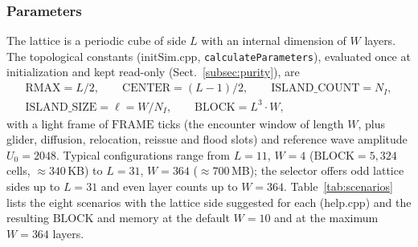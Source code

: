 \documentclass{ijuc}
\begin{document}
\subsubsection{Parameters}\label{subsubsec:parameters}
The lattice is a periodic cube of side $L$ with an internal dimension of $W$ layers.  The topological constants (initSim.cpp, \texttt{calculateParameters}), evaluated once at initialization and kept read-only (Sect.~\ref{subsec:purity}), are
\begin{multline*}
\mathrm{RMAX}=L/2,\qquad \mathrm{CENTER}=(L-1)/2,\qquad
\mathrm{ISLAND\_COUNT}=N_{I},\\
\mathrm{ISLAND\_SIZE}=\ell=W/N_{I},\qquad \mathrm{BLOCK}=L^{3}\cdot W,
\end{multline*}
with a light frame of $\mathrm{FRAME}$ ticks (the encounter window of length $W$, plus glider, diffusion, relocation, reissue and flood slots) and reference wave amplitude $U_{0}=2048$.  Typical configurations range from $L=11$, $W=4$ ($\mathrm{BLOCK}=5{,}324$ cells, $\approx 340$\,KB) to $L=31$, $W=364$ ($\approx 700$\,MB); the selector offers odd lattice sides up to $L=31$ and even layer counts up to $W=364$.  Table~\ref{tab:scenarios} lists the eight scenarios with the lattice side suggested for each (help.cpp) and the resulting $\mathrm{BLOCK}$ and memory at the default $W=10$ and at the maximum $W=364$ layers.
\end{document}
